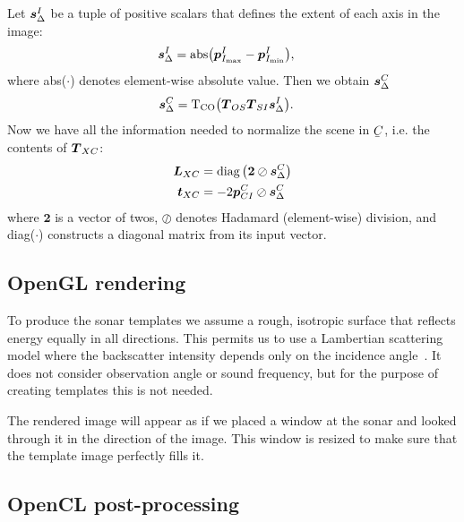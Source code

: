 Let ${\boldsymbol{s}_\Delta^I}$ be a tuple of positive scalars that defines the extent of each axis in the image:
%
\begin{align}\label{eq:M}
\dvec{s}_\Delta^I &= \mathrm{abs}\big(\dvec{p}_{I_\mathrm{max}}^I-\dvec{p}_{I_\mathrm{min}}^I\big),
\end{align}
%
where abs($\cdot$) denotes element-wise absolute value. Then we obtain $\boldsymbol{s}_\Delta^C$
\begin{align}\label{eq:M}
\dvec{s}_\Delta^C &= \mathrm{T_{CO}}\big(\mat{T}_{OS}\mat{T}_{SI}\dvec{s}_\Delta^I\big).
\end{align}
%
Now we have all the information needed to normalize the scene in $\ubar{C}$, i.e. the contents of $\boldsymbol{T}_{XC}$:
%
\begin{align}
\mat{L}_{XC}
&= \diag\left(\boldsymbol{2}\oslash\dvec{s}_\Delta^C\right) \label{eq_L_XC} \\
\dvec{t}_{XC}
&= -2\dvec{p}_{CI}^C\oslash\dvec{s}_\Delta^C \label{eq_t_XC}
\end{align}
%
where $\boldsymbol{2}$ is a vector of twos, $\oslash$ denotes Hadamard (element-wise) division, and diag($\cdot$) constructs a diagonal matrix from its input vector. 



\subsection{OpenGL rendering}

To produce the sonar templates we assume a rough, isotropic surface that reflects energy equally in all directions. This permits us to use a Lambertian scattering model where the backscatter intensity depends only on the incidence angle~\cite{Zhang1999}. It does not consider observation angle or sound frequency, but for the purpose of creating templates this is not needed.   

The rendered image will appear as if we placed a window at the sonar and looked through it in the direction of the image. This window is resized to make sure that the template image perfectly fills it.


\subsection{OpenCL post-processing}

